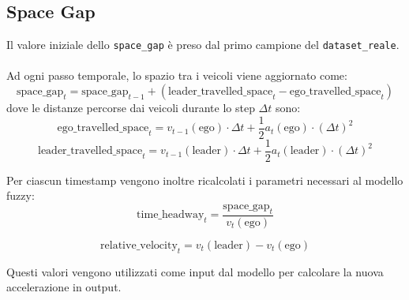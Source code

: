 \subsection{Space Gap}
Il valore iniziale dello \texttt{space\_gap} è preso dal primo campione del \texttt{dataset\_reale}.
\\\\
\noindent Ad ogni passo temporale, lo spazio tra i veicoli viene aggiornato come:
\[
\mathrm{space\_gap}_t = \mathrm{space\_gap}_{t-1} + \left( \mathrm{leader\_travelled\_space}_t - \mathrm{ego\_travelled\_space}_t \right)
\]
dove le distanze percorse dai veicoli durante lo step $\Delta t$ sono:
\[
\mathrm{ego\_travelled\_space}_t = v_{t-1}(\mathrm{ego}) \cdot \Delta t + \frac{1}{2} a_t(\mathrm{ego}) \cdot (\Delta t)^2
\]
\[
\mathrm{leader\_travelled\_space}_t = v_{t-1}(\mathrm{leader}) \cdot \Delta t + \frac{1}{2} a_t(\mathrm{leader}) \cdot (\Delta t)^2
\]

\vspace{10mm}
\noindent Per ciascun timestamp vengono inoltre ricalcolati i parametri necessari al modello fuzzy:  
\[
\mathrm{time\_headway}_t = \frac{\mathrm{space\_gap}_t}{v_t(\mathrm{ego})}
\]

\[
\mathrm{relative\_velocity}_t = v_t(\mathrm{leader}) - v_t(\mathrm{ego})
\]

\noindent Questi valori vengono utilizzati come input dal modello per calcolare la nuova accelerazione in output.









